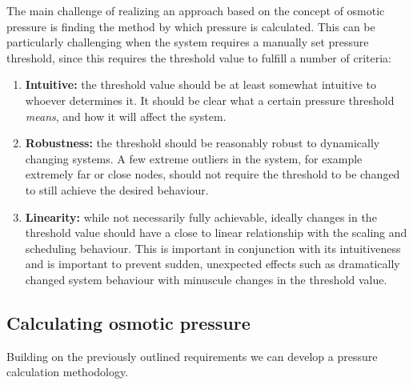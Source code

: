\documentclass[draft,final]{vutinfth} %
\begin{document}
The main challenge of realizing an approach based on the concept of osmotic pressure is finding the method by which pressure is calculated. This can be particularly challenging when the system requires a manually set pressure threshold, since this requires the threshold value to fulfill a number of criteria:
\begin{enumerate}
    \item \textbf{Intuitive:} the threshold value should be at least somewhat intuitive to whoever determines it. It should be clear what a certain pressure threshold \textit{means}, and how it will affect the system.
    \item \textbf{Robustness:} the threshold should be reasonably robust to dynamically changing systems. A few extreme outliers in the system, for example extremely far or close nodes, should not require the threshold to be changed to still achieve the desired behaviour.
    \item \textbf{Linearity:} while not necessarily fully achievable, ideally changes in the threshold value should have a close to linear relationship with the scaling and scheduling behaviour. This is important in conjunction with its intuitiveness and is important to prevent sudden, unexpected effects such as dramatically changed system behaviour with minuscule changes in the threshold value.
\end{enumerate}

\subsection{Calculating osmotic pressure}
Building on the previously outlined requirements we can develop a pressure calculation methodology.
\end{document}
